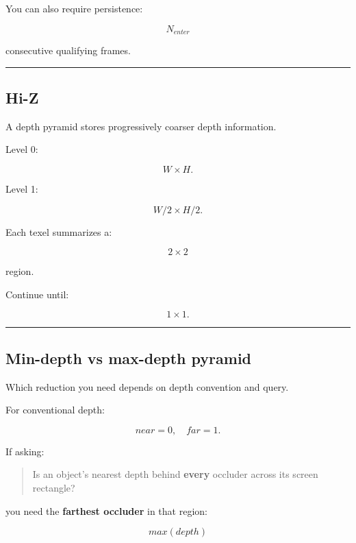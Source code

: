 You can also require persistence:

\[
N_{enter}
\]

consecutive qualifying frames.

\begin{center}\rule{0.5\linewidth}{0.5pt}\end{center}

\subsection{Hi-Z}\label{04-visual-computing-ii-ch040-hi-z}

\hypertarget{04-visual-computing-ii-ch040-hi-z}{}

A depth pyramid stores progressively coarser depth information.

Level 0:

\[
W\times H.
\]

Level 1:

\[
W/2\times H/2.
\]

Each texel summarizes a:

\[
2\times2
\]

region.

Continue until:

\[
1\times1.
\]

\begin{center}\rule{0.5\linewidth}{0.5pt}\end{center}

\subsection{Min-depth vs max-depth pyramid}\label{04-visual-computing-ii-ch040-min-depth-vs-max-depth-pyramid}

\hypertarget{04-visual-computing-ii-ch040-min-depth-vs-max-depth-pyramid}{}

Which reduction you need depends on depth convention and query.

For conventional depth:

\[
near=0,\quad far=1.
\]

If asking:

\begin{quote}
Is an object's nearest depth behind \textbf{every} occluder across its screen rectangle?
\end{quote}

you need the \textbf{farthest occluder} in that region:

\[
\boxed{
max(depth)
}
\]

